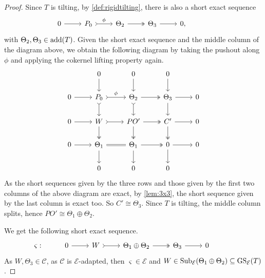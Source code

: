 \begin{proof}
Since $T$ is tilting, by \cref{def:rigidtilting}, there is also a short exact sequence 
\[\begin{tikzcd}
     0 & P_0 & \Theta_2 & \Theta_3 &  0, & 
	\arrow[from=1-1, to=1-2]
	\arrow[tail,"\phi", from=1-2, to=1-3]
	\arrow[two heads,from=1-3, to=1-4]
	\arrow[from=1-4, to=1-5]
\end{tikzcd}\] with $\Theta_2,\Theta_3 \in \operatorname{add}(T)$. Given the short exact sequence and the middle column of the diagram above, we obtain the following diagram by taking the pushout along $\phi$ and applying the cokernel lifting property again.
\[\begin{tikzcd}
         & 0 & 0 & 0 &  \\
	0 & P_0 & \Theta_2  & \Theta_3 &  0 \\
     0 & W & PO' & C' & 0 \\
      0 & \Theta_1 & \Theta_1 & 0 & 0 \\
       & 0 & 0 & 0 & 
	\arrow[from=2-1, to=2-2]
	\arrow[tail,"\phi", from=2-2, to=2-3]
	\arrow[two heads,from=2-3, to=2-4]
	\arrow[from=2-4, to=2-5]
        \arrow[from=3-1, to=3-2]
	\arrow[tail, from=3-2, to=3-3]
	\arrow[two heads,from=3-3, to=3-4]
	\arrow[from=3-4, to=3-5]
        \arrow[from=4-1, to=4-2]
	\arrow[equals, from=4-2, to=4-3]
	\arrow[two heads,from=4-3, to=4-4]
	\arrow[from=4-4, to=4-5]
        \arrow[from=4-2, to=5-2]
	\arrow[two heads, from=3-2, to=4-2]
	\arrow[tail,from=2-2, to=3-2]
	\arrow[from=1-2, to=2-2]
        \arrow[from=4-3, to=5-3]
	\arrow[two heads, from=3-3, to=4-3]
	\arrow[tail,from=2-3, to=3-3]
	\arrow[from=1-3, to=2-3]
        \arrow[from=4-4, to=5-4]
	\arrow[two heads, from=3-4, to=4-4]
	\arrow[from=2-4, to=3-4]
	\arrow[from=1-4, to=2-4]
\end{tikzcd} \]
As the short sequences given by the three rows and those given by the first two columns of the above diagram are exact, by \cref{lem:3x3}, the short sequence given by the last column is exact too. So $C' \cong \Theta_3$. Since $T$ is tilting, the middle column splits, hence $PO' \cong \Theta_1 \oplus \Theta_2$.

We get the following short exact sequence.
\[\begin{tikzcd}
    \varsigma: & 0 & W & \Theta_1 \oplus \Theta_2 & \Theta_3 &  0 & 
	\arrow[from=1-2, to=1-3]
	\arrow[tail, from=1-3, to=1-4]
	\arrow[two heads,from=1-4, to=1-5]
	\arrow[from=1-5, to=1-6]
\end{tikzcd}\]
As $W,\Theta_3 \in \mathscr{C}$, as $\mathscr{C}$ is $\mathcal{E}$-adapted, then $\varsigma \in \mathcal{E}$ and $W \in \operatorname{Sub}_\mathcal{E}(\Theta_1 \oplus \Theta_2) \subseteq \operatorname{GS}_\mathcal{E}(T)$.


\end{proof}
